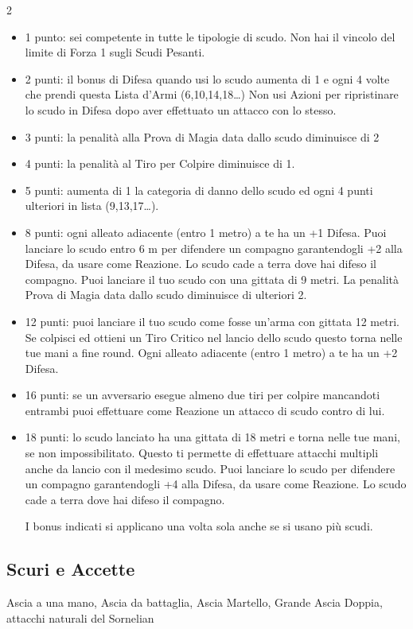 \begin{multicols}{2}
\begin{itemize}[leftmargin=*] \setlength{\itemsep}{0pt}
\item 1 punto: sei competente in tutte le tipologie di scudo. Non hai il vincolo del limite di Forza 1 sugli Scudi Pesanti.
\item 2 punti: il bonus di Difesa quando usi lo scudo aumenta di 1 e ogni 4 volte che prendi questa Lista d'Armi (6,10,14,18…) Non usi Azioni per ripristinare lo scudo in Difesa dopo aver effettuato un attacco con lo stesso.
\item 3 punti: la penalità alla Prova di Magia data dallo scudo diminuisce di 2
\item 4 punti: la penalità al Tiro per Colpire diminuisce di 1.
\item 5 punti: aumenta di 1 la categoria di danno dello scudo ed ogni 4 punti ulteriori in lista (9,13,17…).
\item 8 punti: ogni alleato adiacente (entro 1 metro) a te ha un +1 Difesa. Puoi lanciare lo scudo entro 6 m per difendere un compagno garantendogli +2 alla Difesa, da usare come Reazione. Lo scudo cade a terra dove hai difeso il compagno. Puoi lanciare il tuo scudo con una gittata di 9 metri. La penalità Prova di Magia data dallo scudo diminuisce di ulteriori 2.
\item 12 punti: puoi lanciare il tuo scudo come fosse un'arma con gittata 12 metri. Se colpisci ed ottieni un Tiro Critico nel lancio dello scudo questo torna nelle tue mani a fine round. Ogni alleato adiacente (entro 1 metro) a te ha un +2 Difesa.
\item 16 punti: se un avversario esegue almeno due tiri per colpire mancandoti entrambi puoi effettuare come Reazione un attacco di scudo contro di lui.
\item 18 punti: lo scudo lanciato ha una gittata di 18 metri e torna nelle tue mani, se non impossibilitato. Questo ti permette di effettuare attacchi multipli anche da lancio con il medesimo scudo. Puoi lanciare lo scudo per difendere un compagno garantendogli +4 alla Difesa, da usare come Reazione. Lo scudo cade a terra dove hai difeso il compagno.

I bonus indicati si applicano una volta sola anche se si usano più scudi.

\end{itemize}

\subsection{Scuri e Accette} Ascia a una mano, Ascia da battaglia, Ascia Martello, Grande Ascia Doppia, attacchi naturali del Sornelian\label{listaasce}


\end{multicols}
